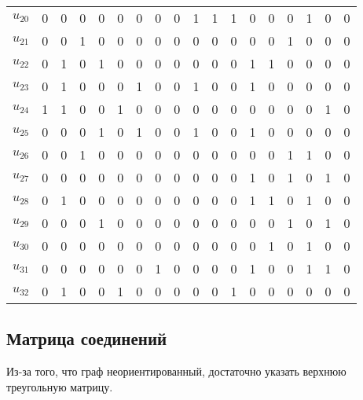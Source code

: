 \documentclass[12pt, a4paper] {ncc}
\begin{document}
\begin{tabular}{|c|c|c|c|c|c|c|c|c|c|c|c|c|c|c|c|c|c|}
$u_{20}$ & 0 & 0 & 0 & 0 & 0 & 0 & 0 & 0 & 1 & 1 & 1 & 0 & 0 & 0 & 1 & 0 & 0 \\
$u_{21}$ & 0 & 0 & 1 & 0 & 0 & 0 & 0 & 0 & 0 & 0 & 0 & 0 & 0 & 1 & 0 & 0 & 0 \\
$u_{22}$ & 0 & 1 & 0 & 1 & 0 & 0 & 0 & 0 & 0 & 0 & 0 & 1 & 1 & 0 & 0 & 0 & 0 \\
$u_{23}$ & 0 & 1 & 0 & 0 & 0 & 1 & 0 & 0 & 1 & 0 & 0 & 1 & 0 & 0 & 0 & 0 & 0 \\
$u_{24}$ & 1 & 1 & 0 & 0 & 1 & 0 & 0 & 0 & 0 & 0 & 0 & 0 & 0 & 0 & 0 & 1 & 0 \\
$u_{25}$ & 0 & 0 & 0 & 1 & 0 & 1 & 0 & 0 & 1 & 0 & 0 & 1 & 0 & 0 & 0 & 0 & 0 \\
$u_{26}$ & 0 & 0 & 1 & 0 & 0 & 0 & 0 & 0 & 0 & 0 & 0 & 0 & 0 & 1 & 1 & 0 & 0 \\
$u_{27}$ & 0 & 0 & 0 & 0 & 0 & 0 & 0 & 0 & 0 & 0 & 0 & 1 & 0 & 1 & 0 & 1 & 0 \\
$u_{28}$ & 0 & 1 & 0 & 0 & 0 & 0 & 0 & 0 & 0 & 0 & 0 & 1 & 1 & 0 & 1 & 0 & 0 \\
$u_{29}$ & 0 & 0 & 0 & 1 & 0 & 0 & 0 & 0 & 0 & 0 & 0 & 0 & 0 & 1 & 0 & 1 & 0 \\
$u_{30}$ & 0 & 0 & 0 & 0 & 0 & 0 & 0 & 0 & 0 & 0 & 0 & 0 & 1 & 0 & 1 & 0 & 0 \\
$u_{31}$ & 0 & 0 & 0 & 0 & 0 & 0 & 1 & 0 & 0 & 0 & 0 & 1 & 0 & 0 & 1 & 1 & 0 \\
$u_{32}$ & 0 & 1 & 0 & 0 & 1 & 0 & 0 & 0 & 0 & 0 & 1 & 0 & 0 & 0 & 0 & 0 & 0 \\
\hline
\end{tabular}

\subsection{Матрица соединений}

Из-за того, что граф неориентированный, достаточно указать верхнюю треугольную матрицу.
\end{document}
